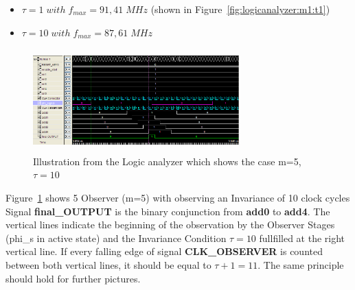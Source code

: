 \begin{itemize}
 \item $\tau = 1 \;with\; f_{max}=91,41\;MHz$ (shown in Figure~\ref{fig:logicanalyzer:m1:t1})
 \item $\tau = 10 \;with\; f_{max}=87,61\;MHz$ 
\end{itemize}

\begin{figure}[]
\centering
\includegraphics[width=300px,height=150px]{../../pictures/Logicanalyzer/5_Observer_Tau_10.png}
\caption[Logicanalyzer m=5,$\tau = 10$]{Illustration from the Logic analyzer which shows the case m=5,$\tau = 10$}
\label{fig:logicanalyzer:m5:t10}
\end{figure}

Figure~\ref{fig:logicanalyzer:m5:t10} shows 5 Observer (m=5) with observing an Invariance of 10 clock cycles\\
Signal \textbf{final\_OUTPUT} is the binary conjunction from \textbf{add0} to \textbf{add4}. 
The vertical lines indicate the beginning of the observation by the Observer Stages (phi\_s in active state) and 
the Invariance Condition $\tau = 10$ fullfilled at the right vertical line. 
If every falling edge of signal \textbf{CLK\_OBSERVER} is counted
between both vertical lines, it should be equal to $\tau + 1 = 11$. 
The same principle should hold for further pictures. 


